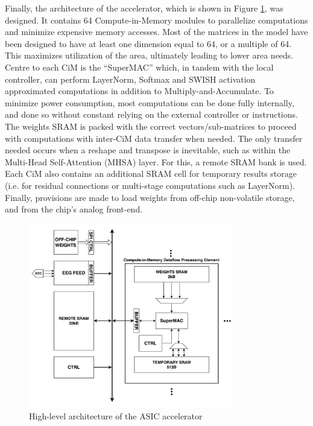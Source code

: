 \documentclass[12pt, hidelinks]{article}
\begin{document}
    Finally, the architecture of the accelerator, which is shown in Figure \ref*{fig:accel_arch}, was designed. It contains 64 Compute-in-Memory modules to parallelize computations and minimize expensive memory accesses. Most of the matrices in the model have
    been designed to have at least one dimension equal to 64, or a multiple of 64. This maximizes utilization of the area, ultimately leading to lower area needs. Centre to each CiM is the ``SuperMAC'' which, in tandem with the local controller, can perform
    LayerNorm, Softmax and SWISH activation approximated computations in addition to Multiply-and-Accumulate. To minimize power consumption, most computations can be done fully internally, and done so without constant relying on the external controller or
    instructions. The weights SRAM is packed with the correct vectors/sub-matrices to proceed with computations with inter-CiM data transfer when needed. The only transfer needed occurs when a reshape and transpose is inevitable, such as within the Multi-Head
    Self-Attention (MHSA) layer. For this, a remote SRAM bank is used. Each CiM also contains an additional SRAM cell for temporary results storage (i.e. for residual connections or multi-stage computations such as LayerNorm). Finally, provisions are made to
    load weights from off-chip non-volatile storage, and from the chip's analog front-end.

    \begin{figure}
        \centering
        \includegraphics[width=0.8\textwidth]{assets/ASIC_arch.png}
        \caption{High-level architecture of the ASIC accelerator}
        \label{fig:accel_arch}
    \end{figure}
\end{document}
